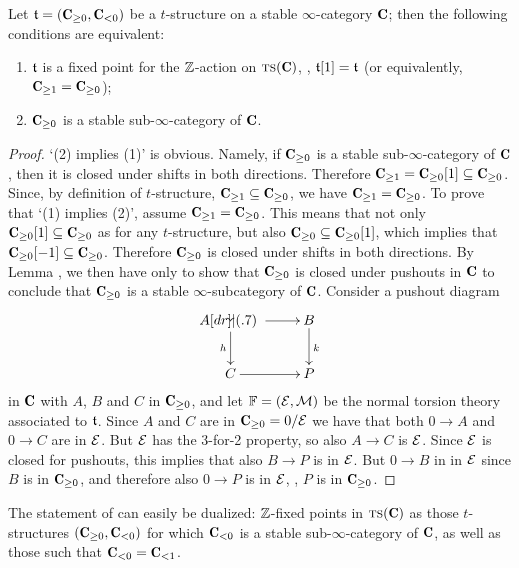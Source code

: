 \begin{proposition}\label{stableare}
Let $\tee=(\C_{\geq 0},\C_{<0})$ be a $t$-structure on a stable $\infty$-category $\C$; then the following conditions are equivalent:
\begin{enumerate}
\item $\mathfrak{t}$ is a fixed point for the $\mathbb{Z} $-action on $\ts(\C)$, \ie, $\mathfrak{t}[1]=\mathfrak{t}$ (or equivalently, $\C_{\geq 1}= \C_{\geq 0}$);
\item $\C_{\geq 0}$ is a stable sub-$\infty$-category of $\C$.
\end{enumerate}
\end{proposition}
\begin{proof}
`(2) implies (1)' is obvious. Namely, if  $\C_{\ge 0}$ is a stable sub-$\infty$-category of $\C$, then it is closed under shifts in both directions. Therefore $\C_{\ge 1}=\C_{\geq 0}[1]\subseteq \C_{\ge 0}$. Since, by definition of $t$-structure, $\C_{\geq 1}\subseteq \C_{\geq 0}$, we have $\C_{\geq 1}= \C_{\geq 0}$. To prove that `(1) implies (2)', assume $\C_{\geq 1}=\C_{\geq 0}$. This means that not only $\C_{\geq 0}[1]\subseteq \C_{\geq 0}$ as for any $t$-structure, but also $\C_{\geq 0}\subseteq \C_{\geq 0}[1]$, which implies that $\C_{\geq 0}[-1]\subseteq \C_{\geq 0}$. Therefore $\C_{\geq 0}$ is closed under shifts in both directions. By Lemma ,  we then have only to show that $\C_{\geq 0}$ is closed under pushouts in $\C$ to conclude that $\C_{\geq 0}$ is a stable $\infty$-subcategory of $\C$. Consider a pushout diagram
\[
\xymatrix{
 A \ar[r]\ar[d]_h \po & B\ar[d]^k \\
 C \ar[r] & P
}
\]
in $\C$ with $A$, $B$ and $C$ in $\C_{\geq 0}$, and let $\mathbb{F}=(\mathcal{E},\mathcal{M})$ be the normal torsion theory associated to $\mathfrak{t}$. Since $A$ and $C$ are in $\C_{\geq 0} = 0/\E$ we have that both $0\to A$ and $0\to C$ are in $\mathcal{E}$. But $\mathcal{E}$ has the 3-for-2 property, so also $A\to C$ is $\mathcal{E}$. Since $\mathcal{E}$ is closed for pushouts, this implies that also $B\to P$ is in $\mathcal{E}$. But $0\to B$ in in $\mathcal{E}$ since $B$ is in $\C_{\geq 0}$, and therefore also $0\to P$ is in $\mathcal{E}$, \ie, $P$ is in $\C_{\geq 0}$.
\end{proof}
\begin{remark}\label{dual.of.the.above}
The statement of \aprop {} can easily be dualized: $\mathbb{Z} $-fixed points in $\ts(\C)$ as those $t$-structures $(\C_{\geq 0},\C_{<0})$ for which $\C_{<0}$ is a stable sub-$\infty$-category of $\C$, as well as those such that $\C_{<0} = \C_{<1}$.
\end{remark}
